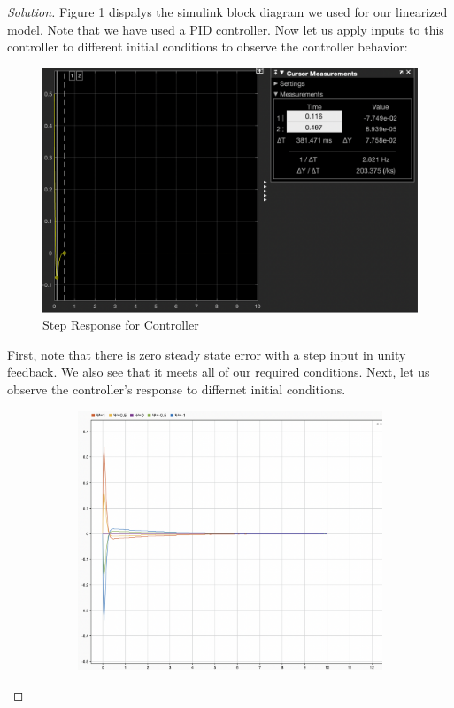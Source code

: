 \documentclass{article}
\begin{document}
\begin{proof}[Solution]
Figure 1 dispalys the simulink block diagram we used for our linearized model. Note that we have used a PID controller. 
Now let us apply inputs to this controller to different initial conditions to observe the controller behavior:
\begin{figure}[h!]
    \includegraphics[width=\linewidth]{img1.png}
    \caption{Step Response for Controller}
\end{figure}
First, note that there is zero steady state error with a step input in unity feedback. We also see that it meets all of our required conditions. Next, let us observe the controller's response to differnet initial conditions. 
\newpage
\begin{figure}
    \centering
    \begin{subfigure}{0.4\linewidth}
      \includegraphics[width=\linewidth]{img2.png}

\end{subfigure}
\end{figure}
\end{proof}
\end{document}
